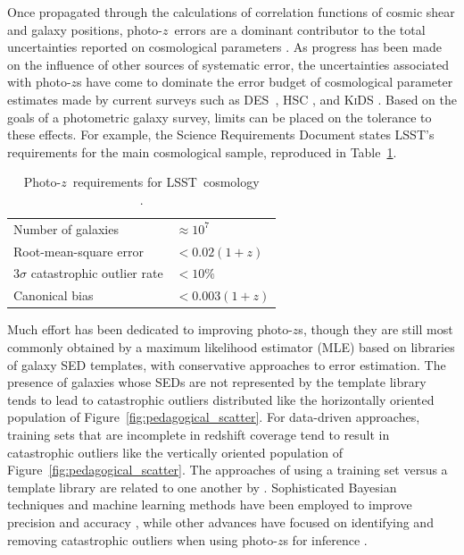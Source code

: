 \documentclass[iop]{emulateapj}
\newcommand{\Fig}[1]{Figure~\ref{#1}}
\newcommand{\project}[1]{\textsc{#1}}
\newcommand{\lsst}{\project{LSST}}
\newcommand{\des}{\project{DES}}
\newcommand{\pz}{photo-$z$}
\newcommand{\Pz}{Photo-$z$}
\begin{document}
Once propagated through the calculations of correlation functions of cosmic shear and galaxy positions, \pz\ errors are a dominant contributor to the total uncertainties reported on cosmological parameters \citep{abruzzo_impact_2019}.
As progress has been made on the influence of other sources of systematic error, the uncertainties associated with \pz s have come to dominate the error budget of cosmological parameter estimates made by current surveys such as \des\ \citep{hoyle_dark_2018}, \project{HSC} \citep{tanaka_photometric_2018}, and \project{KiDS} \citep{hildebrandt_kids-450:_2017}.
Based on the goals of a photometric galaxy survey, limits can be placed on the tolerance to these effects.
For example, the Science Requirements Document \citep{mandelbaum_weak_2017} states \lsst's requirements for the main cosmological sample, reproduced in Table~\ref{tab:lsstsrd}.

\begin{table}
	\begin{center}
		\caption{\Pz\ requirements for \lsst\ cosmology\\
				\citep{mandelbaum_weak_2017}.}
		\begin{tabular}{ll}
			Number of galaxies & $\approx 10^{7}$\\
			Root-mean-square error & $< 0.02 (1 + z)$\\
			$3 \sigma$ catastrophic outlier rate & $< 10\%$\\
			Canonical bias & $< 0.003 (1 + z)$\\
		\end{tabular}
		\label{tab:lsstsrd}
	\end{center}
\end{table}

Much effort has been dedicated to improving \pz s, though they are still most commonly obtained by a maximum likelihood estimator (MLE) based on libraries of galaxy SED templates, with conservative approaches to error estimation.
The presence of galaxies whose SEDs are not represented by the template library tends to lead to catastrophic outliers distributed like the horizontally oriented population of \Fig{fig:pedagogical_scatter}.
For data-driven approaches, training sets that are incomplete in redshift coverage tend to result in catastrophic outliers like the vertically oriented population of \Fig{fig:pedagogical_scatter}.
The approaches of using a training set versus a template library are related to one another by \citet{budavari_unified_2009}.
Sophisticated Bayesian techniques and machine learning methods have been employed to improve precision \citep{carliles_random_2010} and accuracy \citep{sadeh_annz2:_2016}, while other advances have focused on identifying and removing catastrophic outliers when using \pz s for inference \citep{gorecki_new_2014}. 
\end{document}
